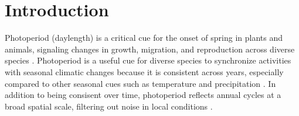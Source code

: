 \documentclass{article}
\begin{document}
\newpage
\section*{Introduction}
\par Photoperiod (daylength) is a critical cue for the onset of spring in plants and animals, signaling changes in growth, migration, and reproduction across diverse species \citep[e.g.,][]{flynn2018,Howe:1996,lagercrantz2009,bradshaw2007,mcallan2006,solbakken1994,barker1976, farner1964}. Photoperiod is a useful cue for diverse species to synchronize activities with seasonal climatic changes \citep[e.g.,][]{Singh:2017, Basler:2012, Hsu:2011} because it is consistent across years, especially compared to other seasonal cues such as temperature and precipitation \citep{saikkonen2012}. In addition to being consisent over time, photoperiod reflects annual cycles at a broad spatial scale, filtering out noise in local conditions \citep{winkler2014}. %
\end{document}
